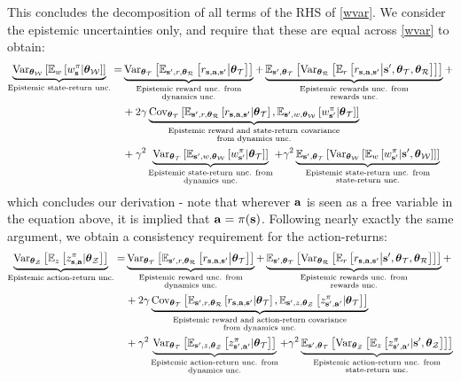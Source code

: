 \documentclass{article}
\begin{document}
This concludes the decomposition of all terms of the RHS of \cref{wvar}. We consider the epistemic uncertainties only, and require that these are equal across \cref{wvar} to obtain:
\begin{align}
\underbrace{\Var_{\thetamcw} \sqb{\E_w\sqb{\wb | \thetamcw}}}_{\text{Epistemic state-return unc.}} =& \underbrace{\Var_{\thetamct} \sqb{ \E_{\ns, r, \thetamcr} \sqb{\rsanb \big| \thetamct}}}_{\substack{\text{Epistemic reward unc. from} \\ \text{dynamics unc.}}} + \underbrace{\E_{\ns, \thetamct}\sqb{ \Var_{\thetamcr} \sqb{ \E_r \sqb{\rsanb \big| \ns, \thetamct, \thetamcr}}}}_{\substack{\text{Epistemic rewards unc. from} \\ \text{rewards unc.}}} \nonumber + \\
& + 2 \gamma \underbrace{\Cov_{\thetamct}\sqb{\E_{\ns, r, \thetamcr}\sqb{\rsanb | \thetamct}, \E_{\ns, w, \thetamcw}\sqb{\wnb | \thetamct}}}_{\substack{\text{Epistemic reward and state-return covariance} \\ \text{from dynamics unc.}}} \nonumber\\
& + \gamma^2 \underbrace{\Var_{\thetamct} \sqb{\E_{\ns, w, \thetamcw} \sqb{\wnb | \thetamct}}}_{\substack{\text{Epistemic state-return unc. from} \\ \text{dynamics unc.}}}  + \gamma^2 \underbrace{\E_{\ns, \thetamct}\sqb{\Var_{\thetamcw} \sqb{ \E_w \sqb{\wnb | \ns, \thetamcw}}}}_{\substack{\text{Epistemic state-return unc. from} \\ \text{state-return unc.}}} \label{wepeq}
\end{align}
which concludes our derivation - note that wherever $\ac$ is seen as a free variable in the equation above, it is implied that $\ac = \pi(\s)$. Following nearly exactly the same argument, we obtain a consistency requirement for the action-returns:
\begin{align}
\underbrace{\Var_{\thetamcz} \sqb{\E_z\sqb{\zb | \thetamcz}}}_{\text{Epistemic action-return unc.}} =& \underbrace{\Var_{\thetamct} \sqb{ \E_{\ns, r, \thetamcr} \sqb{\rsanb \big| \thetamct}}}_{\substack{\text{Epistemic reward unc. from} \nonumber \\ \text{dynamics unc.}}} + \underbrace{\E_{\ns, \thetamct}\sqb{ \Var_{\thetamcr} \sqb{ \E_r \sqb{\rsanb \big| \ns, \thetamct, \thetamcr}}}}_{\substack{\text{Epistemic rewards unc. from} \\ \text{rewards unc.}}} + \\
& + 2 \gamma \underbrace{\Cov_{\thetamct}\sqb{\E_{\ns, r, \thetamcr}\sqb{\rsanb | \thetamct}, \E_{\ns, z, \thetamcz}\sqb{\znb | \thetamct}}}_{\substack{\text{Epistemic reward and action-return covariance} \\ \text{from dynamics unc.}}} \nonumber \\
& + \gamma^2 \underbrace{\Var_{\thetamct} \sqb{\E_{\ns, z, \thetamcz} \sqb{\znb | \thetamct}}}_{\substack{\text{Epistemic action-return unc. from} \\ \text{dynamics unc.}}}  +  \gamma^2 \underbrace{\E_{\ns, \thetamct}\sqb{\Var_{\thetamcz} \sqb{ \E_z \sqb{\znb | \ns, \thetamcz}}}}_{\substack{\text{Epistemic action-return unc. from} \\ \text{state-return unc.}}} \label{zepeq}
\end{align}
\end{document}
